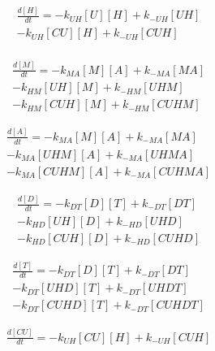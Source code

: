 \begin{equation}
\begin{split}
\frac{d[H]}{dt} = - k_{UH}[U][H] + k_{-UH}[UH] \\%
                  - k_{UH}[CU][H] + k_{-UH}[CUH] \\%
\end{split}
\end{equation}

\begin{equation}
\begin{split}
\frac{d[M]}{dt} = - k_{MA}[M][A] + k_{-MA}[MA]  \\%
                  - k_{HM}[UH][M] + k_{-HM}[UHM] \\%
                  - k_{HM}[CUH][M] + k_{-HM}[CUHM] %
\end{split}
\end{equation}

\begin{equation}
\begin{split}
\frac{d[A]}{dt} = - k_{MA}[M][A] + k_{-MA}[MA] \\%
                  - k_{MA}[UHM][A] + k_{-MA}[UHMA] \\%
                  - k_{MA}[CUHM][A] + k_{-MA}[CUHMA] %
\end{split}
\end{equation}

\begin{equation}
\begin{split}
\frac{d[D]}{dt} = - k_{DT}[D][T] + k_{-DT}[DT] \\%
                  - k_{HD}[UH][D] + k_{-HD}[UHD] \\%
                  - k_{HD}[CUH][D] + k_{-HD}[CUHD] %
\end{split}
\end{equation}

\begin{equation}
\begin{split}
\frac{d[T]}{dt} = - k_{DT}[D][T] + k_{-DT}[DT] \\%
                  - k_{DT}[UHD][T] + k_{-DT}[UHDT] \\%
                  - k_{DT}[CUHD][T] + k_{-DT}[CUHDT] %
\end{split}
\end{equation}

\begin{equation}
\begin{split}
\frac{d[CU]}{dt} = - k_{UH}[CU][H] + k_{-UH}[CUH] %
\end{split}
\end{equation}

